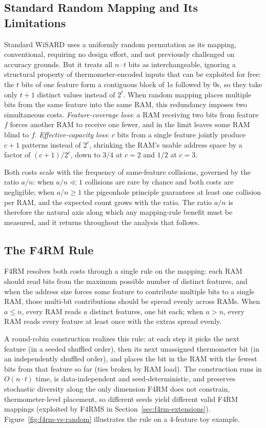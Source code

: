 \subsection{Standard Random Mapping and Its Limitations}
\label{sec:f4rm-cost}

Standard WiSARD uses a uniformly random permutation as its mapping, conventional, requiring no design effort, and not previously challenged on accuracy grounds. But it treats all $n \cdot t$ bits as interchangeable, ignoring a structural property of thermometer-encoded inputs that can be exploited for free: the $t$ bits of one feature form a contiguous block of 1s followed by 0s, so they take only $t+1$ distinct values instead of $2^t$. When random mapping places multiple bits from the same feature into the same RAM, this redundancy imposes two simultaneous costs. \emph{Feature-coverage loss}: a RAM receiving two bits from feature $f$ forces another RAM to receive one fewer, and in the limit leaves some RAM blind to $f$. \emph{Effective-capacity loss}: $c$ bits from a single feature jointly produce $c+1$ patterns instead of $2^c$, shrinking the RAM's usable address space by a factor of $(c+1)/2^c$, down to $3/4$ at $c=2$ and $1/2$ at $c=3$.

Both costs scale with the frequency of same-feature collisions, governed by the ratio $a/n$: when $a/n \ll 1$ collisions are rare by chance and both costs are negligible; when $a/n \geq 1$ the pigeonhole principle guarantees at least one collision per RAM, and the expected count grows with the ratio. The ratio $a/n$ is therefore the natural axis along which any mapping-rule benefit must be measured, and it returns throughout the analysis that follows.

\subsection{The F4RM Rule}
\label{sec:f4rm-rule}

F4RM resolves both costs through a single rule on the mapping: each RAM should read bits from the maximum possible number of distinct features, and when the address size forces some feature to contribute multiple bits to a single RAM, those multi-bit contributions should be spread evenly across RAMs. When $a \leq n$, every RAM reads $a$ distinct features, one bit each; when $a > n$, every RAM reads every feature at least once with the extras spread evenly.

A round-robin construction realizes this rule: at each step it picks the next feature (in a seeded shuffled order), then its next unassigned thermometer bit (in an independently shuffled order), and places the bit in the RAM with the fewest bits from that feature so far (ties broken by RAM load). The construction runs in $O(n \cdot t)$ time, is data-independent and seed-deterministic, and preserves stochastic diversity along the only dimension F4RM does not constrain, thermometer-level placement, so different seeds yield different valid F4RM mappings (exploited by F4RMS in Section~\ref{sec:f4rm-extensions}). Figure~\ref{fig:f4rm-vs-random} illustrates the rule on a 4-feature toy example.

